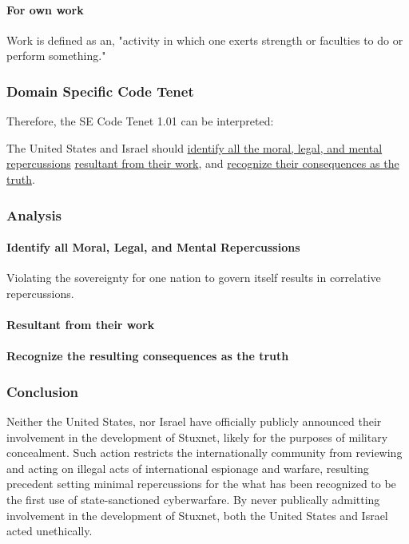 \documentclass[12pt]{article}
\begin{document}
\begin{multicols}{2}
\paragraph{For own work}
Work is defined as an, "activity in which one exerts strength or faculties to do or perform something."\cite{workDefinition}

\subsubsection{Domain Specific Code Tenet}

Therefore, the SE Code Tenet 1.01 can be interpreted:
\begin{framed}
The United States and Israel should \ul{identify all the moral, legal, and mental repercussions} \ul{resultant from their work}, and \ul{recognize their consequences as the truth}.
\end{framed}

\subsubsection{Analysis}

\paragraph{Identify all Moral, Legal, and Mental Repercussions}

Violating the sovereignty for one nation to govern itself results in correlative repercussions.

\paragraph{Resultant from their work}

\paragraph{Recognize the resulting consequences as the truth}

\subsubsection{Conclusion}

Neither the United States, nor Israel have officially publicly announced their involvement in the development of Stuxnet, likely for the purposes of military concealment. Such action restricts the internationally community from reviewing and acting on illegal acts of international espionage and warfare, resulting precedent setting minimal repercussions for the what has been recognized to be the first use of state-sanctioned cyberwarfare. By never publically admitting involvement in the development of Stuxnet, both the United States and Israel acted unethically.



\end{multicols}
\end{document}
